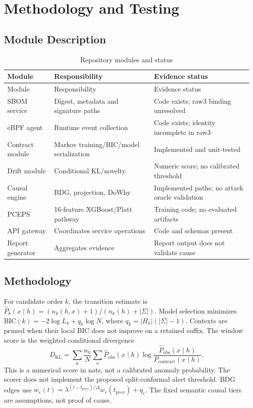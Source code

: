 \documentclass[12pt,a4paper,oneside]{report}
\begin{document}
\chapter{Methodology and Testing}
\section{Module Description}
\begin{longtable}{p{1.25in}p{2.35in}p{2.3in}}\caption{Repository modules and status}\label{tab:modules}\\\toprule Module&Responsibility&Evidence status\\\midrule\endfirsthead\toprule Module&Responsibility&Evidence status\\\midrule\endhead
SBOM service&Digest, metadata and signature paths&Code exists; raw3 binding unresolved\\eBPF agent&Runtime event collection&Code exists; identity incomplete in raw3\\Contract module&Markov training/BIC/model serialization&Implemented and unit-tested\\Drift module&Conditional KL/novelty&Numeric score; no calibrated threshold\\Causal engine&BDG, projection, DoWhy&Implemented paths; no attack oracle validation\\PCEPS&16-feature XGBoost/Platt pathway&Training code; no evaluated artifacts\\API gateway&Coordinates service operations&Code and schemas present\\Report generator&Aggregates evidence&Report output does not validate cause\\\bottomrule\end{longtable}
\section{Methodology}
For candidate order $k$, the transition estimate is $\hat P_k(x\mid h)=(n_k(h,x)+1)/(n_k(h)+|\Sigma|)$. Model selection minimizes $\mathrm{BIC}(k)=-2\log L_k+q_k\log N$, where $q_k=|H_k|(|\Sigma|-1)$. Contexts are pruned when their local BIC does not improve on a retained suffix. The window score is the weighted conditional divergence
\[D_{\mathrm{KL}}=\sum_h\frac{n_h}{N}\sum_x\widehat P_{\mathrm{obs}}(x\mid h)\log\frac{\widehat P_{\mathrm{obs}}(x\mid h)}{P_{\mathrm{contract}}(x\mid h)}.\]
This is a numerical score in nats, not a calibrated anomaly probability. The scorer does not implement the proposed split-conformal alert threshold. BDG edges use $w_e(t)=\lambda^{(t-t_{prev})/\Delta}w_e(t_{prev})+q_e$. The fixed semantic causal tiers are assumptions, not proof of cause.
\end{document}
